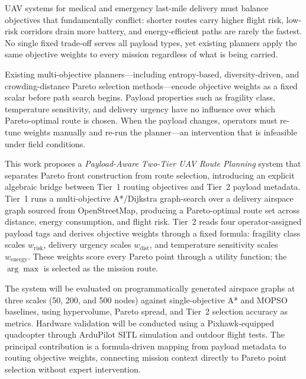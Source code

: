 \documentclass{ssnreview}
\begin{document}
\makereviewtitle
\reviewfrontmatter

\begin{reviewabstract}
UAV systems for medical and emergency last-mile delivery must balance objectives that
fundamentally conflict: shorter routes carry higher flight risk, low-risk corridors drain
more battery, and energy-efficient paths are rarely the fastest. No single fixed
trade-off serves all payload types, yet existing planners apply the same objective
weights to every mission regardless of what is being carried.

Existing multi-objective planners---including entropy-based, diversity-driven, and
crowding-distance Pareto selection methods---encode objective weights as a fixed scalar
before path search begins. Payload properties such as fragility class, temperature
sensitivity, and delivery urgency have no influence over which Pareto-optimal route is
chosen. When the payload changes, operators must re-tune weights manually and re-run the
planner---an intervention that is infeasible under field conditions.

This work proposes a \textit{Payload-Aware Two-Tier UAV Route Planning} system that
separates Pareto front construction from route selection, introducing an explicit
algebraic bridge between Tier~1 routing objectives and Tier~2 payload metadata. Tier~1
runs a multi-objective A*/Dijkstra graph-search over a delivery airspace graph sourced
from OpenStreetMap, producing a Pareto-optimal route set across distance, energy
consumption, and flight risk. Tier~2 reads four operator-assigned payload tags and
derives objective weights through a fixed formula: fragility class scales
$w_\mathrm{risk}$, delivery urgency scales $w_\mathrm{dist}$, and temperature
sensitivity scales $w_\mathrm{energy}$. These weights score every Pareto point through a
utility function; the $\arg\max$ is selected as the mission route.

The system will be evaluated on programmatically generated airspace graphs at three
scales (50, 200, and 500 nodes) against single-objective A* and MOPSO baselines, using
hypervolume, Pareto spread, and Tier~2 selection accuracy as metrics. Hardware
validation will be conducted using a Pixhawk-equipped quadcopter through ArduPilot SITL
simulation and outdoor flight tests. The principal contribution is a formula-driven
mapping from payload metadata to routing objective weights, connecting mission context
directly to Pareto point selection without expert intervention.

\end{reviewabstract}
\end{document}
